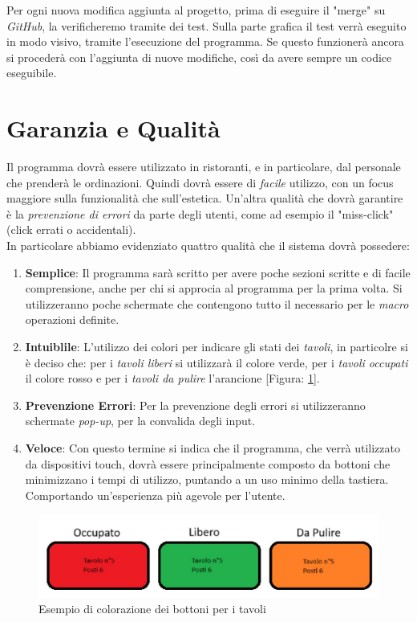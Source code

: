 \documentclass{book}
\begin{document}
Per ogni nuova modifica aggiunta al progetto, prima di eseguire il "merge" su \textit{GitHub}, la verificheremo tramite dei test. Sulla parte grafica il test verrà eseguito in modo visivo, tramite l'esecuzione del programma.
Se questo funzionerà ancora si procederà con l'aggiunta di nuove modifiche, così da avere sempre un codice eseguibile.

\section{Garanzia e Qualità}

Il programma dovrà essere utilizzato in ristoranti, e in particolare, dal personale che prenderà le ordinazioni. Quindi dovrà essere di \textit{facile} utilizzo, con un focus maggiore sulla funzionalità che sull'estetica. Un'altra qualità che dovrà garantire è la \textit{prevenzione di errori} da parte degli utenti, come ad esempio il "miss-click" (click errati o accidentali).\\

In particolare abbiamo evidenziato quattro qualità che il sistema dovrà possedere:

\begin{enumerate}
    \item \textbf{Semplice}: Il programma sarà scritto per avere poche sezioni scritte e di facile comprensione, anche per chi si approcia al programma per la prima volta. Si utilizzeranno poche schermate che contengono tutto il necessario per le \textit{macro} operazioni definite.
    \item \textbf{Intuiblile}: L'utilizzo dei colori per indicare gli stati dei \textit{tavoli}, in particolre si è deciso che: per i \textit{tavoli liberi} si utilizzarà il colore verde, per i \textit{tavoli occupati} il colore rosso e per i \textit{tavoli da pulire} l'arancione [Figura: \ref{fig: es_bottoni}].
    \item \textbf{Prevenzione Errori}: Per la prevenzione degli errori si utilizzeranno schermate \textit{pop-up}, per la convalida degli input.
    \item \textbf{Veloce}: Con questo termine si indica che il programma, che verrà utilizzato da dispositivi touch, dovrà essere principalmente composto da bottoni che minimizzano i tempi di utilizzo, puntando a un uso minimo della tastiera. Comportando un'esperienza più agevole per l'utente.
\end{enumerate}

\begin{figure}[h]
    \centering
    \includegraphics[width=0.6\linewidth]{Esempio_Bottoni.jpg}
    \caption{Esempio di colorazione dei bottoni per i tavoli}
    \label{fig: es_bottoni}
\end{figure}
\end{document}
